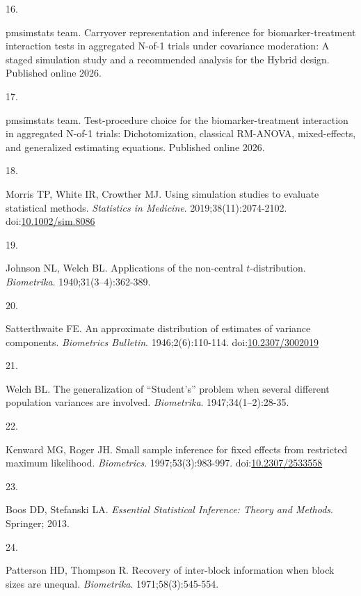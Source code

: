 \documentclass[
  11pt,
]{article}
\newlength{\cslhangindent}
\newlength{\csllabelwidth}
\newenvironment{CSLReferences}[2] %
 {\begin{list}{}{%
  \setlength{\itemindent}{0pt}
  \setlength{\leftmargin}{0pt}
  \setlength{\parsep}{0pt}
  \ifodd #1
   \setlength{\leftmargin}{\cslhangindent}
   \setlength{\itemindent}{-1\cslhangindent}
  \fi
  \setlength{\itemsep}{#2\baselineskip}}}
 {\end{list}}
\newcommand{\CSLLeftMargin}[1]{\parbox[t]{\csllabelwidth}{\strut#1\strut}}
\newcommand{\CSLRightInline}[1]{\parbox[t]{\linewidth - \csllabelwidth}{\strut#1\strut}}
\begin{document}
\begin{CSLReferences}{0}{1}
\CSLLeftMargin{16. }%
\CSLRightInline{{pmsimstats team}. Carryover representation and inference for biomarker-treatment interaction tests in aggregated {N}-of-1 trials under covariance moderation: A staged simulation study and a recommended analysis for the {Hybrid} design. Published online 2026.}

\CSLLeftMargin{17. }%
\CSLRightInline{{pmsimstats team}. Test-procedure choice for the biomarker-treatment interaction in aggregated {N}-of-1 trials: Dichotomization, classical {RM-ANOVA}, mixed-effects, and generalized estimating equations. Published online 2026.}

\CSLLeftMargin{18. }%
\CSLRightInline{Morris TP, White IR, Crowther MJ. Using simulation studies to evaluate statistical methods. \emph{Statistics in Medicine}. 2019;38(11):2074-2102. doi:\href{https://doi.org/10.1002/sim.8086}{10.1002/sim.8086}}

\CSLLeftMargin{19. }%
\CSLRightInline{Johnson NL, Welch BL. Applications of the non-central \(t\)-distribution. \emph{Biometrika}. 1940;31(3--4):362-389.}

\CSLLeftMargin{20. }%
\CSLRightInline{Satterthwaite FE. An approximate distribution of estimates of variance components. \emph{Biometrics Bulletin}. 1946;2(6):110-114. doi:\href{https://doi.org/10.2307/3002019}{10.2307/3002019}}

\CSLLeftMargin{21. }%
\CSLRightInline{Welch BL. The generalization of {{``Student's''}} problem when several different population variances are involved. \emph{Biometrika}. 1947;34(1--2):28-35.}

\CSLLeftMargin{22. }%
\CSLRightInline{Kenward MG, Roger JH. Small sample inference for fixed effects from restricted maximum likelihood. \emph{Biometrics}. 1997;53(3):983-997. doi:\href{https://doi.org/10.2307/2533558}{10.2307/2533558}}

\CSLLeftMargin{23. }%
\CSLRightInline{Boos DD, Stefanski LA. \emph{Essential Statistical Inference: Theory and Methods}. Springer; 2013.}

\CSLLeftMargin{24. }%
\CSLRightInline{Patterson HD, Thompson R. Recovery of inter-block information when block sizes are unequal. \emph{Biometrika}. 1971;58(3):545-554.}


\end{CSLReferences}
\end{document}
